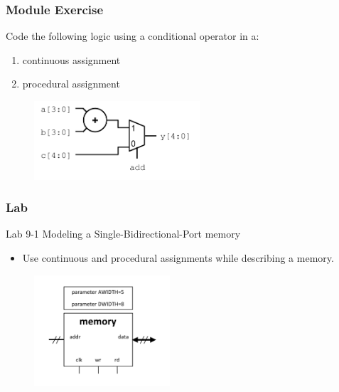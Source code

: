 \documentclass[t, notes, xcolor=table]{beamer}
\begin{document}
\begin{frame}
\frametitle{Module Exercise}
Code the following logic using a conditional operator in a:
\begin{enumerate}
\item continuous assignment
\item procedural assignment
\end{enumerate}
\begin{figure}
    \includegraphics[width=0.55\textwidth]{img/08_ex.png}
\end{figure}
\end{frame}

\begin{frame}
\frametitle{Lab}
Lab 9-1 Modeling a Single-Bidirectional-Port memory
\begin{itemize}
\item Use continuous and procedural assignments while describing a memory.
\end{itemize}
\begin{figure}
    \includegraphics[width=0.45\textwidth]{img/08_lab.png}
\end{figure}
\end{frame}
\end{document}
